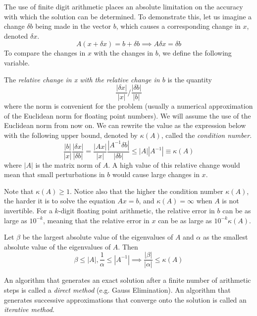 \documentclass{article}
\begin{document}
  The use of finite digit arithmetic places an absolute limitation on the accuracy with which the solution can be determined. To demonstrate this, let us imagine a change $\delta b$ being made in the vector $b$, which causes a corresponding change in $x$, denoted $\delta x$. 
  \[A(x + \delta x) = b + \delta b \implies A \delta x = \delta b\]
  To compare the changes in $x$ with the changes in $b$, we define the following variable. 
  \begin{definition}
  The \textit{relative change in x with the relative change in $b$} is the quantity
  \[\frac{|\delta x|}{|x|} \bigg/ \frac{|\delta b|}{|b|}\]
  where the norm is convenient for the problem (usually a numerical approximation of the Euclidean norm for floating point numbers). We will assume the use of the Euclidean norm from now on. We can rewrite the value as the expression below with the following upper bound, denoted by $\kappa (A)$, called the \textit{condition number}. 
  \[\frac{|b|}{|x|} \frac{|\delta x|}{|\delta b|} = \frac{|Ax|}{|x|} \frac{|A^{-1} \delta b|}{|\delta b|} \leq |A||A^{-1}| \equiv \kappa (A)\]
  where $|A|$ is the matrix norm of $A$. 
  A high value of this relative change would mean that small perturbations in $b$ would cause large changes in $x$.
  \end{definition}

  Note that $\kappa(A) \geq 1$. Notice also that the higher the condition number $\kappa (A)$, the harder it is to solve the equation $A x = b$, and $\kappa(A) = \infty$ when $A$ is not invertible. For a $k$-digit floating point arithmetic, the relative error in $b$ can be as large as $10^{-k}$, meaning that the relative error in $x$ can be as large as $10^{-k} \kappa (A)$. 

  Let $\beta$ be the largest absolute value of the eigenvalues of $A$ and $\alpha$ as the smallest absolute value of the eigenvalues of $A$. Then 
  \[\beta \leq |A|, \frac{1}{\alpha} \leq |A^{-1}| \implies \frac{|\beta|}{|\alpha|} \leq \kappa(A)\]


  \begin{definition}
  An algorithm that generates an exact solution after a finite number of arithmetic steps is called a \textit{direct method} (e.g. Gauss Elimination). An algorithm that generates successive approximations that converge onto the solution is called an \textit{iterative method}. 
  \end{definition}
\end{document}
